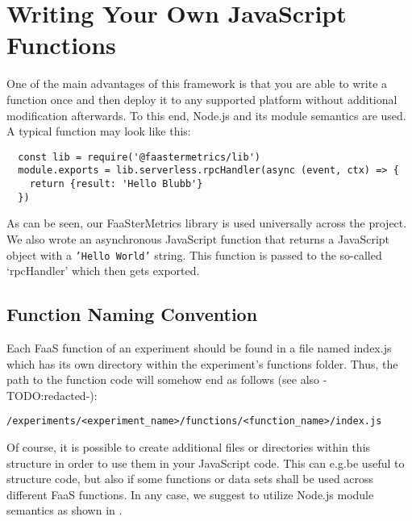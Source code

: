 \documentclass[../main.tex]{subfiles}
\begin{document}
\section{Writing Your Own JavaScript Functions}\label{sec:jsFunctions}

One of the main advantages of this framework is that you are able to write a function once 
and then deploy it to any supported platform without additional modification afterwards.
To this end, Node.js and its module semantics are used. A typical function may look like this:

\begin{tcolorbox}
\begin{verbatim}
  const lib = require('@faastermetrics/lib')
  module.exports = lib.serverless.rpcHandler(async (event, ctx) => {
    return {result: 'Hello Blubb'}
  })
\end{verbatim}
\end{tcolorbox}

As can be seen, our FaaSterMetrics library is used universally across the project. 
We also wrote an asynchronous JavaScript function that returns a JavaScript object with a \texttt{'Hello World'} string. 
This function is passed to the so-called `rpcHandler' which then gets exported. 

\subsection{Function Naming Convention}

Each FaaS function of an experiment should be found in a file named index.js which has its own directory within the experiment's functions folder.
Thus, the path to the function code will somehow end as follows (see also -TODO:\@ redacted-):

\begin{tcolorbox}
  \texttt{/experiments/<experiment\_name>/functions/<function\_name>/index.js}
\end{tcolorbox}

Of course, it is possible to create additional files or directories within this structure in order to use them in your JavaScript code.
This can e.g.\@ be useful to structure code, but also if some functions or data sets shall be used across different FaaS functions.
In any case, we suggest to utilize Node.js module semantics as shown in .
\end{document}
